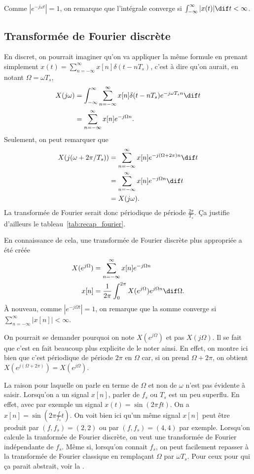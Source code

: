 Comme $|e^{-j\omega t}| = 1$, on remarque que l'intégrale
converge si $\int_{-\infty}^\infty |x(t)| \dif t < \infty$.

\subsection{Transformée de Fourier discrète}
\label{sec:fourier_discret}
En discret, on pourrait imaginer qu'on va appliquer la même formule en prenant
simplement $x(t) =  \sum_{n=-\infty}^\infty x[n] \delta(t-nT_s)$, c'est à dire
qu'on aurait, en notant $\Omega = \omega T_s$,
\begin{align}
  \label{eq:tfd}
  X(j\omega) & = \int_{-\infty}^\infty \sum_{n=-\infty}^\infty x[n]
  \delta(t-nT_s) e^{-j\omega T_sn} \dif t\\
  \nonumber
  & = \sum_{n=-\infty}^\infty x[n] e^{-j\Omega n}.
\end{align}
Seulement, on peut remarquer que
\begin{align*}
  X(j(\omega+2\pi/T_s)) & = \sum_{n=-\infty}^\infty x[n]
  e^{-j(\Omega+2\pi) n} \dif t\\
  & = \sum_{n=-\infty}^\infty x[n]
  e^{-j\Omega n} \dif t\\
  & = X(j\omega).
\end{align*}
La transformée de Fourier serait donc périodique de période $\frac{2\pi}{T_s}$.
Ça justifie d'ailleurs le tableau~\ref{tab:recap_fourier}.

En connaissance de cela, une transformée de Fourier discrète plus appropriée
a été créée
\begin{align*}
  X(e^{j\Omega}) & = \sum_{n=-\infty}^\infty x[n]e^{-j\Omega n}\\
  x[n] & = \frac{1}{2\pi}
  \int_{0}^{2\pi} X(e^{j\Omega})e^{j\Omega n} \dif \Omega.
\end{align*}
À nouveau, comme $|e^{-j\Omega t}| = 1$, on remarque que la somme
converge si $\sum_{n=-\infty}^\infty |x[n]| < \infty$.

On pourrait se demander pourquoi on note $X(e^{j\Omega})$ et pas $X(j\Omega)$.
Il se fait que c'est en fait beaucoup plus explicite de le noter ainsi.
En effet, on montre ici bien que c'est périodique de période $2\pi$
en $\Omega$ car, si on prend $\Omega + 2\pi$,
on obtient $X(e^{j(\Omega + 2\pi)}) = X(e^{j\Omega})$.

La raison pour laquelle on parle en terme de $\Omega$ et non de $\omega$ n'est pas
évidente à saisir.
Lorsqu'on a un signal $x[n]$, parler de $f_s$ ou $T_s$ est un peu superflu.
En effet, avec par exemple un signal $x(t) = \sin(2\pi f t)$.
On a $x[n] = \sin\left(2\pi \frac{f}{f_s} t\right)$.
On voit bien ici qu'un même signal $x[n]$ peut être produit par $(f,f_s) = (2,2)$
ou par $(f,f_s) = (4,4)$ par exemple.
Lorsqu'on calcule la tranformée de Fourier discrète, on veut une transformée de Fourier
indépendante de $f_s$.
Même si, lorsqu'on connait $f_s$, on peut facilement repasser à la transformée de Fourier
classique en remplaçant $\Omega$ par $\omega T_s$.
Pour ceux pour qui ça parait abstrait, voir la .


